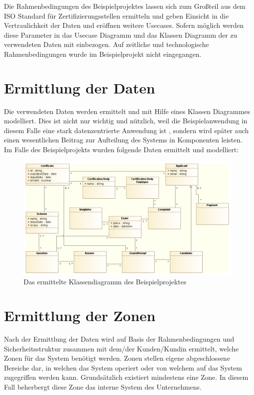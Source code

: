 Die Rahmenbedingungen des Beispielprojektes lassen sich zum Großteil aus dem ISO Standard für Zertifizierungsstellen ermitteln \cite{ISO_CERT} und geben Einsicht in die Vertraulichkeit der Daten und eröffnen weitere Usecases. Sofern möglich werden diese Parameter in das Usecase Diagramm und das Klassen Diagramm der zu verwendeten Daten mit einbezogen. Auf zeitliche und technologische Rahmenbedingungen wurde im Beispielprojekt nicht eingegangen.

\section{Ermittlung der Daten}
Die verwendeten Daten werden ermittelt und mit Hilfe eines Klassen Diagrammes modelliert. Dies ist nicht nur wichtig und nützlich, weil die Beispielanwendung in diesem Falle eine stark datenzentrierte Anwendung ist \cite[S. 105]{effektiv}, sondern wird später auch einen wesentlichen Beitrag zur Aufteilung des Systems in Komponenten leisten. Im Falle des Beispielprojekts wurden folgende Daten ermittelt und modelliert:

\begin{figure}[H]
    \centering
    \includegraphics[scale=0.5]{uml/class.png}
    \caption{Das ermittelte Klassendiagramm des Beispielprojektes}
\end{figure}

\section{Ermittlung der Zonen}
Nach der Ermittlung der Daten wird auf Basis der Rahmenbedingungen und Sicherheitsstruktur zusammen mit dem/der Kunden/Kundin ermittelt, welche Zonen für das System benötigt werden. Zonen stellen eigene abgeschlossene Bereiche dar, in welchen das System operiert oder von welchem auf das System zugegriffen werden kann. Grundsätzlich existiert mindestens eine Zone. In diesem Fall beherbergt diese Zone das interne System des Unternehmens.

